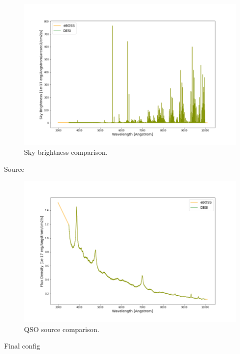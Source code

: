 \begin{figure}[h]
\centering
\includegraphics[width=12cm]{images/specsim/sky_brightness.png}
\caption{Sky brightness comparison.}
\label{fig:sky_brightness}
\end{figure}

Source

\begin{figure}[h]
\centering
\includegraphics[width=12cm]{images/specsim/source.png}
\caption{QSO source comparison.}
\label{fig:qso_source}
\end{figure}

Final config

